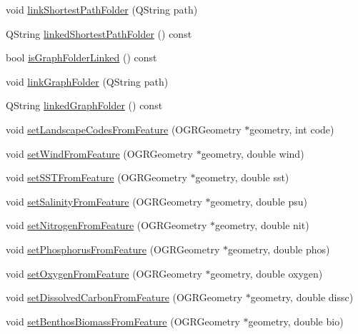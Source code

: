\begin{DoxyCompactItemize}
void \mbox{\hyperlink{class_displace_model_a6387de00adb15c208385510fe76cdf87}{link\+Shortest\+Path\+Folder}} (Q\+String path)
\item 
Q\+String \mbox{\hyperlink{class_displace_model_a0def79ff371b79b7caea5c887c76f79a}{linked\+Shortest\+Path\+Folder}} () const
\item 
bool \mbox{\hyperlink{class_displace_model_a66a1f72c48fdb14d0ac6841f2228f10f}{is\+Graph\+Folder\+Linked}} () const
\item 
void \mbox{\hyperlink{class_displace_model_a91e286de166b54caa31d566c35eb67c1}{link\+Graph\+Folder}} (Q\+String path)
\item 
Q\+String \mbox{\hyperlink{class_displace_model_a5c1ce7f9bf9548e79e9da52e46d89d8f}{linked\+Graph\+Folder}} () const
\item 
void \mbox{\hyperlink{class_displace_model_a675f98636ec425185c267039b36aa6ca}{set\+Landscape\+Codes\+From\+Feature}} (O\+G\+R\+Geometry $\ast$geometry, int code)
\item 
void \mbox{\hyperlink{class_displace_model_ae1a1d3f5ebf3d8fe2088822f70939346}{set\+Wind\+From\+Feature}} (O\+G\+R\+Geometry $\ast$geometry, double wind)
\item 
void \mbox{\hyperlink{class_displace_model_ab2b49b329dbd03a01b3314897f578693}{set\+S\+S\+T\+From\+Feature}} (O\+G\+R\+Geometry $\ast$geometry, double sst)
\item 
void \mbox{\hyperlink{class_displace_model_aed1c73dea8220eaebb1a424c87e3abcd}{set\+Salinity\+From\+Feature}} (O\+G\+R\+Geometry $\ast$geometry, double psu)
\item 
void \mbox{\hyperlink{class_displace_model_a3369a8c856b7648b2267c804d580a833}{set\+Nitrogen\+From\+Feature}} (O\+G\+R\+Geometry $\ast$geometry, double nit)
\item 
void \mbox{\hyperlink{class_displace_model_a630e1ff810ef8f0c2d1bc80f92612b8e}{set\+Phosphorus\+From\+Feature}} (O\+G\+R\+Geometry $\ast$geometry, double phos)
\item 
void \mbox{\hyperlink{class_displace_model_ab1b36c0b8e8133a5a8a5093dc4d437a7}{set\+Oxygen\+From\+Feature}} (O\+G\+R\+Geometry $\ast$geometry, double oxygen)
\item 
void \mbox{\hyperlink{class_displace_model_af2334c994a7b56cb3df7581d74ac9ee8}{set\+Dissolved\+Carbon\+From\+Feature}} (O\+G\+R\+Geometry $\ast$geometry, double dissc)
\item 
void \mbox{\hyperlink{class_displace_model_a7688b7211352106bbb324ff1dfe68965}{set\+Benthos\+Biomass\+From\+Feature}} (O\+G\+R\+Geometry $\ast$geometry, double bio)

\end{DoxyCompactItemize}
